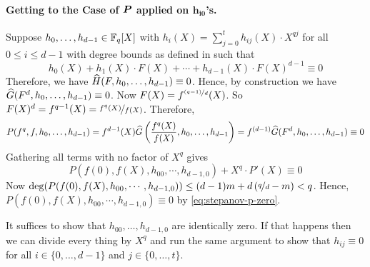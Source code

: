 \paragraph*{Getting to the Case of $\boldsymbol{P}$ applied on $\bm{h_{i0}}$'s.} Suppose $h_0,\dots, h_{d-1}\in \mathbb{F}_q[X]$ with $h_i(X)=\sum_{j=0}^th_{ij}(X)\cdot X^{qj}$ for all $ 0\leq i\leq d-1$ with degree bounds as defined in \StepanovLinIndeplem such that $$h_0(X)+h_1(X)\cdot F(X)+\cdots +h_{d-1}(X)\cdot F(X)^{d-1}\equiv 0$$Therefore, we have $\widehat{H}(F,h_0,\dots, h_{d-1})\equiv 0$. Hence, by construction we have $\widehat{G}(F^d,h_0,\dots, h_{d-1})\equiv 0$. Now $F(X)=f^{\nicefrac{(q-1)}{d}}(X)$. So $F(X)^d=f^{q-1}(X)=\nicefrac{f^q(X)}{f(X)}$. Therefore, $$P(f^q,f,h_0,\dots, h_{d-1})=f^{d-1}(X)\widehat{G}\left( \frac{f^q(X)}{f(X)},h_0,\dots, h_{d-1} \right)=f^{(d-1)}\widehat{G}(F^d,h_0,\dots, h_{d-1})\equiv 0$$Gathering all terms with no factor of $X^q$ gives 
\begin{equation}\label{eq:stepanov-p-zero}
  P(f(0),f(X),h_{00},\cdots, h_{d-1,0})+X^q\cdot P'(X)\equiv 0
\end{equation}
Now $\deg(P(f(0),f(X),h_{00},\cdots, h_{d-1,0}))\leq (d-1)m+d\left(\nicefrac{q}d-m\right)<q$. Hence, $P(f(0),f(X),h_{00},\cdots, h_{d-1,0})\equiv 0$ by \eqref{eq:stepanov-p-zero}. 

\begin{enough}
It suffices to show that $h_{00},\dots, h_{d-1,0}$ are identically zero. If that happens then we can divide every thing by $X^q$ and run the same argument to show that $h_{ij}\equiv 0$ for all $i\in\{0,\dots, d-1\}$ and $j\in\{0,\dots, t\}$. 
\end{enough}

